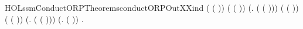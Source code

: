 \begin{SaveVerbatim}{HOLssmConductORPTheoremsconductORPOutXXind}
       ( ( )) \HOLSymConst{\HOLTokenConj{}}
       ( ( )) \HOLSymConst{\HOLTokenConj{}}
     (\HOLSymConst{\HOLTokenForall{}}.   ( ( ))) \HOLSymConst{\HOLTokenConj{}}
       ( ( )) \HOLSymConst{\HOLTokenConj{}}
       ( ( )) \HOLSymConst{\HOLTokenConj{}}
     (\HOLSymConst{\HOLTokenForall{}}.   ( ( ))) \HOLSymConst{\HOLTokenConj{}}
     (\HOLSymConst{\HOLTokenForall{}}.   ( )) \HOLSymConst{\HOLTokenImp{}}
     \HOLSymConst{\HOLTokenForall{}} .   
\end{SaveVerbatim}
\newcommand{\HOLssmConductORPTheoremsconductORPOutXXind}{\UseVerbatim{HOLssmConductORPTheoremsconductORPOutXXind}}
